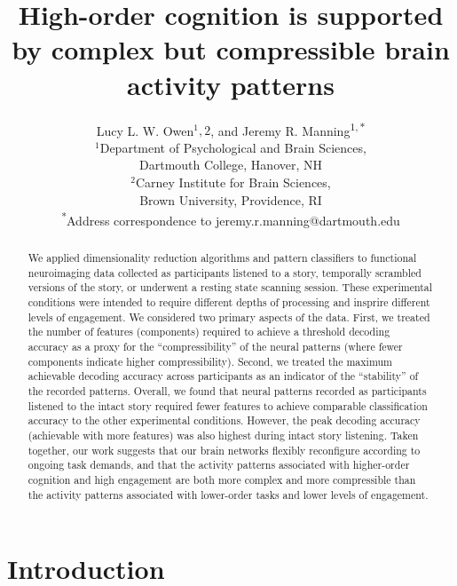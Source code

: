 \documentclass[english]{article}
\title{High-order cognition is supported by complex but compressible brain activity patterns}
\author{Lucy L. W. Owen$^1, 2$, and Jeremy R. Manning\textsuperscript{$1,
*$}\\$^1$Department of Psychological and Brain Sciences,\\Dartmouth College,
Hanover, NH\\[0.1cm]$^2$Carney Institute for Brain Sciences,\\Brown University,
Providence, RI\\[0.1cm] \textsuperscript{*}Address correspondence to
jeremy.r.manning@dartmouth.edu}
\begin{document}
\maketitle


\begin{abstract} 

We applied dimensionality reduction algorithms and pattern classifiers to
functional neuroimaging data collected as participants listened to a story,
temporally scrambled versions of the story, or underwent a resting state
scanning session. These experimental conditions were intended to require
different depths of processing and insprire different levels of engagement. We
considered two primary aspects of the data. First, we treated the number of
features (components) required to achieve a threshold decoding accuracy as a
proxy for the ``compressibility'' of the neural patterns (where fewer
components indicate higher compressibility). Second, we treated the maximum
achievable decoding accuracy across participants as an indicator of the
``stability'' of the recorded patterns. Overall, we found that neural patterns
recorded as participants listened to the intact story required fewer features
to achieve comparable classification accuracy to the other experimental
conditions. However, the peak decoding accuracy (achievable with more features)
was also highest during intact story listening. Taken together, our work
suggests that our brain networks flexibly reconfigure according to ongoing task
demands, and that the activity patterns associated with higher-order cognition
and high engagement are both more complex and more compressible than the
activity patterns associated with lower-order tasks and lower levels of
engagement.

\end{abstract}

\doublespacing

\section*{Introduction}
\end{document}
